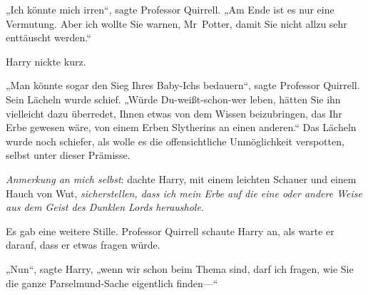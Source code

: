 „Ich könnte mich irren“, sagte Professor Quirrell. „Am Ende ist es nur eine Vermutung. Aber ich wollte Sie warnen, Mr~Potter, damit Sie nicht allzu sehr enttäuscht werden.“

Harry nickte kurz.

„Man könnte sogar den Sieg Ihres Baby-Ichs bedauern“, sagte Professor Quirrell. Sein Lächeln wurde schief. „Würde Du-weißt-schon-wer leben, hätten Sie ihn vielleicht dazu überredet, Ihnen etwas von dem Wissen beizubringen, das Ihr Erbe gewesen wäre, von einem Erben Slytherins an einen anderen.“ Das Lächeln wurde noch schiefer, als wolle es die offensichtliche Unmöglichkeit verspotten, selbst unter dieser Prämisse.

\emph{Anmerkung an mich selbst}: dachte Harry, mit einem leichten Schauer und einem Hauch von Wut, \emph{sicherstellen, dass ich mein Erbe auf die eine oder andere Weise aus dem Geist des Dunklen Lords heraushole}.

Es gab eine weitere Stille. Professor Quirrell schaute Harry an, als warte er darauf, dass er etwas fragen würde.

„Nun“, sagte Harry, „wenn wir schon beim Thema sind, darf ich fragen, wie Sie die ganze Parselmund-Sache eigentlich finden—“

